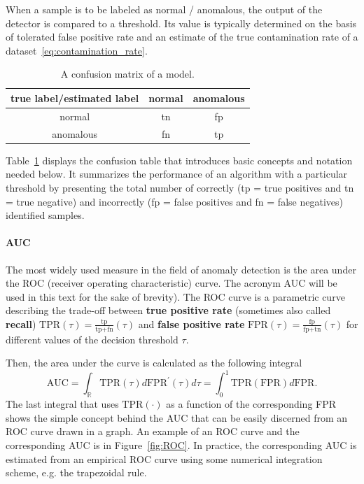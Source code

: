 When a sample is to be labeled as normal / anomalous, the output of the detector is compared to a threshold. Its value is typically determined on the basis of tolerated false positive rate and an estimate of the true contamination rate of a dataset~\eqref{eq:contamination_rate}.
\begin{table}
\centering
	\begin{tabular}{c | c c}
		true label/estimated label & normal & anomalous \\
		\hline
		normal & tn & fp  \\
		anomalous & fn & tp 
	\end{tabular}
	\caption{A confusion matrix of a model.}
	\label{tab:conf_ex}
\end{table}
Table~\ref{tab:conf_ex} displays the confusion table that introduces basic concepts and notation needed below. It summarizes the performance of an algorithm with a particular threshold by presenting the total number of correctly (tp = true positives and tn = true negative) and incorrectly (fp = false positives and fn = false negatives) identified samples. 

\paragraph{AUC}
The most widely used measure in the field of anomaly detection is the area under the ROC (receiver operating characteristic) curve. The acronym AUC will be used in this text for the sake of brevity). The ROC curve is a parametric curve describing the trade-off between \textbf{true positive rate} (sometimes also called \textbf{recall}) $\text{TPR}(\tau) = \frac{\text{tp}}{\text{tp+fn}}(\tau)$ and \textbf{false positive rate} $\text{FPR}(\tau) = \frac{\text{fp}}{\text{fp+tn}}(\tau)$ for different values of the decision threshold $\tau$. 

Then, the area under the curve is calculated as the following integral
\begin{equation}
\label{eq:auc}
\text{AUC}=\int_{\mathbb{R}}\text{TPR}(\tau)d\text{FPR}^{\prime}(\tau)d\tau = \int_0^1\text{TPR}(\text{FPR})d\text{FPR}.
\end{equation}
The last integral that uses $\text{TPR}(\cdot)$ as a function of the corresponding FPR shows the simple concept behind the AUC that can be easily discerned from an ROC curve drawn in a graph. An example of an ROC curve and the corresponding AUC is in Figure~\ref{fig:ROC}. In practice, the corresponding AUC is estimated from an empirical ROC curve using some numerical integration scheme, e.g. the trapezoidal rule.

